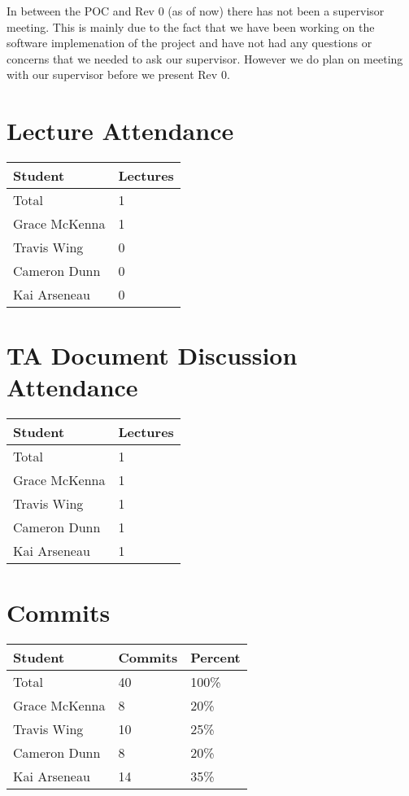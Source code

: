 \documentclass{article}
\begin{document}
In between the POC and Rev 0 (as of now) there has not been a supervisor meeting. This is mainly due to the fact
that we have been working on the software implemenation of the project and have not had any questions or concerns that we needed to ask our supervisor.
However we do plan on meeting with our supervisor before we present Rev 0.


\section{Lecture Attendance}


\begin{table}[H]
\centering
\begin{tabular}{ll}
\toprule
\textbf{Student} & \textbf{Lectures}\\
\midrule
Total & 1\\
Grace McKenna & 1\\
Travis Wing & 0\\
Cameron Dunn & 0\\
Kai Arseneau & 0\\
\bottomrule
\end{tabular}
\end{table}


\section{TA Document Discussion Attendance}


\begin{table}[H]
\centering
\begin{tabular}{ll}
\toprule
\textbf{Student} & \textbf{Lectures}\\
\midrule
Total & 1\\
Grace McKenna & 1\\
Travis Wing & 1\\
Cameron Dunn & 1\\
Kai Arseneau & 1\\
\bottomrule
\end{tabular}
\end{table}


\section{Commits}

\begin{table}[H]
\centering
\begin{tabular}{lll}
\toprule
\textbf{Student} & \textbf{Commits} & \textbf{Percent}\\
\midrule
Total & 40 & 100\% \\
Grace McKenna & 8 & 20\% \\
Travis Wing & 10 & 25\% \\
Cameron Dunn & 8 & 20\% \\
Kai Arseneau & 14 & 35\% \\
\bottomrule
\end{tabular}
\end{table}
\end{document}
